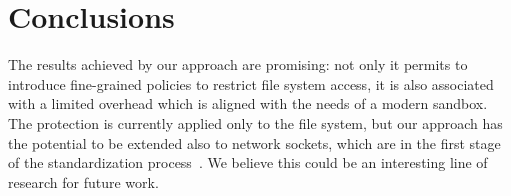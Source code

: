 \section{Conclusions}

The results achieved by our approach are promising: not only it
permits to introduce fine-grained policies to restrict file system
access, it is also associated with a limited overhead which is aligned
with the needs of a modern sandbox. The protection is currently
applied only to the file system, but our approach has the potential to
be extended also to network sockets, which are in the first stage of
the standardization process~\cite{wasi-sockets}. We believe this
could be an interesting line of research for future work.

